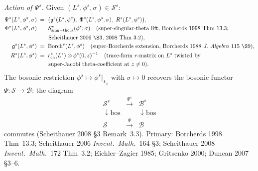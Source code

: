 \begin{definition}
\emph{Action of $\Psi^{s}$.} Given
$(L^{s},\phi^{s},\sigma)\in\mathcal S^{s}$:
\begin{align*}
 \Psi^{s}(L^{s},\phi^{s},\sigma)
 &\;=\;\bigl(
 \mathfrak g^{s}(L^{s},\phi^{s}),\;
 \Phi^{s}(L^{s},\phi^{s},\sigma),\;
 R^{s}(L^{s},\phi^{s})
 \bigr),\\
 \Phi^{s}(L^{s},\phi^{s},\sigma)
 &\;=\;\mathcal S^{s}_{\mathrm{sing-theta}}(\phi^{s};\sigma)\quad
 \text{(super-singular-theta lift, Borcherds 1998 Thm~13.3;}\\
 &\qquad\text{Scheithauer 2006 \S3, 2008 Thm~3.2)},\\
 \mathfrak g^{s}(L^{s},\phi^{s})
 &\;=\;\mathrm{Borch}^{s}(L^{s},\phi^{s})\quad
 \text{(super-Borcherds extension, Borcherds 1988
 \emph{J.\ Algebra}~115 \S9),}\\
 R^{s}(L^{s},\phi^{s})
 &\;=\;r_{\mathrm{ch}}^{s}(L^{s})\otimes\phi^{s}(0,z)^{-1}
 \quad\text{(trace-form $r$-matrix on }L^{s}\text{ twisted by}\\
 &\qquad \text{super-Jacobi theta-coefficient at }z\neq 0\text{)}.
\end{align*}
The bosonic restriction $\phi^{s}\mapsto\phi^{s}|_{L_{\bar 0}}$ with
$\sigma\mapsto 0$ recovers the bosonic functor
$\Psi\colon\mathcal S\to\mathcal B$: the diagram
\[
\begin{array}{ccc}
\mathcal S^{s} & \xrightarrow{\Psi^{s}} & \mathcal B^{s} \\
\downarrow\mathrm{bos} & & \downarrow\mathrm{bos} \\
\mathcal S & \xrightarrow{\Psi} & \mathcal B
\end{array}
\]
commutes (Scheithauer 2008 \S3 Remark~3.3). Primary: Borcherds
1998 Thm~13.3; Scheithauer 2006 \emph{Invent.\ Math.}~164 \S3;
Scheithauer 2008 \emph{Invent.\ Math.}~172 Thm~3.2; Eichler--Zagier
1985; Gritsenko 2000; Duncan 2007 \S3--6.
\end{definition}

